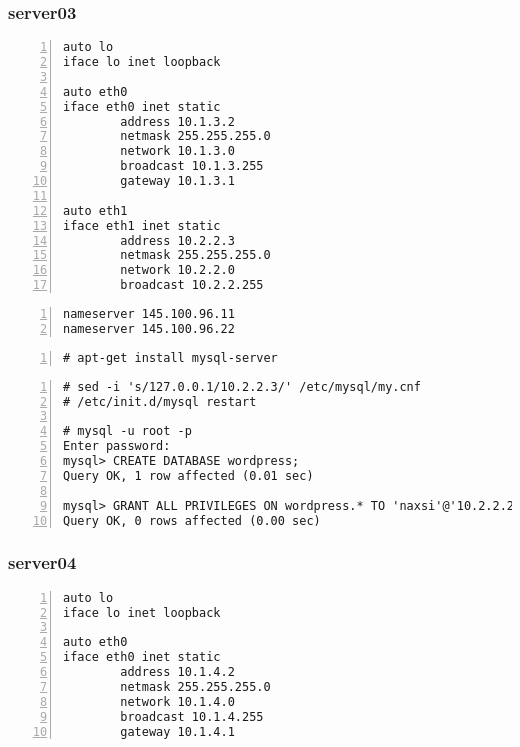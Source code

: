 \documentclass[Configuration]{subfiles}
\begin{document}
\subsubsection{server03}
\label{sec:server03_configuration}

\begin{lstlisting}[frame=single,caption=/etc/network/interfaces,backgroundcolor=\color{gray},breaklines=true,numbers=left,]
auto lo
iface lo inet loopback

auto eth0
iface eth0 inet static
        address 10.1.3.2
        netmask 255.255.255.0
        network 10.1.3.0
        broadcast 10.1.3.255
        gateway 10.1.3.1

auto eth1
iface eth1 inet static
        address 10.2.2.3
        netmask 255.255.255.0
        network 10.2.2.0
        broadcast 10.2.2.255
\end{lstlisting}

\begin{lstlisting}[frame=single,caption=/etc/resolv.conf,backgroundcolor=\color{gray},breaklines=true,numbers=left,]
nameserver 145.100.96.11
nameserver 145.100.96.22
\end{lstlisting}

\begin{lstlisting}[frame=single,caption=MySQL Server 5.1,backgroundcolor=\color{gray},breaklines=true,numbers=left,]
# apt-get install mysql-server
\end{lstlisting}

\begin{lstlisting}[frame=single,caption=MySQL configuration,backgroundcolor=\color{gray},breaklines=true,numbers=left,]
# sed -i 's/127.0.0.1/10.2.2.3/' /etc/mysql/my.cnf
# /etc/init.d/mysql restart

# mysql -u root -p
Enter password: 
mysql> CREATE DATABASE wordpress;
Query OK, 1 row affected (0.01 sec)

mysql> GRANT ALL PRIVILEGES ON wordpress.* TO 'naxsi'@'10.2.2.2' IDENTIFIED BY 'naxsi';
Query OK, 0 rows affected (0.00 sec)
\end{lstlisting}

\subsubsection{server04}
\label{sec:server02_configuration}

\begin{lstlisting}[frame=single,caption=/etc/network/interfaces,backgroundcolor=\color{gray},breaklines=true,numbers=left,]
auto lo
iface lo inet loopback

auto eth0
iface eth0 inet static
        address 10.1.4.2
        netmask 255.255.255.0
        network 10.1.4.0
        broadcast 10.1.4.255
        gateway 10.1.4.1
\end{lstlisting}
\end{document}
